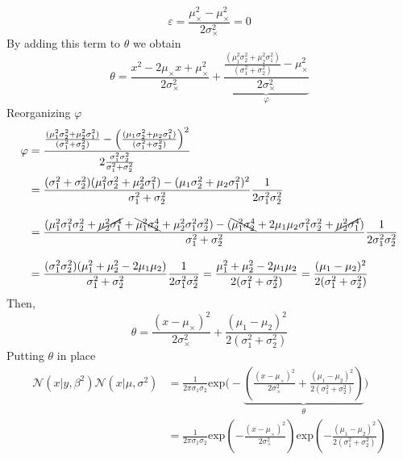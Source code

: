 \documentclass[article]{jss}
\newcommand{\N}{\mathcal{N}}
\begin{document}
%
\begin{equation}
 \varepsilon = \frac{\mu_{\times}^2-\mu_{\times}^2}{2\sigma_{\times}^2} = 0
\end{equation}
%
By adding this term to $\theta$ we obtain
\begin{equation}
 \theta = \frac{x^2 - 2\mu_{\times}x + \mu_{\times}^2 }{2\sigma_{\times}^2} + \underbrace{\frac{ \frac{(\mu_1^2\sigma_2^2 + \mu_2^2\sigma_1^2)}{(\sigma_1^2 + \sigma_2^2) } - \mu_{\times}^2}{2\sigma_{\times}^2}}_{\varphi}
\end{equation}
%
Reorganizing $\varphi$
\begin{equation}
\begin{split}
\varphi & = \frac{\frac{(\mu_1^2\sigma_2^2 + \mu_2^2\sigma_1^2)}{(\sigma_1^2 + \sigma_2^2) } - \left(\frac{(\mu_1\sigma_2^2 + \mu_2\sigma_1^2)}{(\sigma_1^2 + \sigma_2^2) }\right)^2 }{2\frac{\sigma_1^2\sigma_2^2}{\sigma_1^2+\sigma_2^2}}  \\
& = \frac{(\sigma_1^2 + \sigma_2^2)(\mu_1^2\sigma_2^2 + \mu_2^2\sigma_1^2) - (\mu_1\sigma_2^2 + \mu_2\sigma_1^2)^2}{\sigma_1^2 + \sigma_2^2}\frac{1}{2\sigma_1^2\sigma_2^2} \\[0.3cm]
& = \frac{(\mu_1^2\sigma_1^2\sigma_2^2 + \cancel{\mu_2^2\sigma_1^4} + \bcancel{\mu_1^2\sigma_2^4} + \mu_2^2\sigma_1^2\sigma_2^2) - (\bcancel{\mu_1^2\sigma_2^4} + 2\mu_1\mu_2\sigma_1^2\sigma_2^2 + \cancel{\mu_2^2\sigma_1^4} )}{\sigma_1^2 + \sigma_2^2}  \frac{1}{2\sigma_1^2\sigma_2^2} \\[0.3cm]
& = \frac{(\sigma_1^2\sigma_2^2)(\mu_1^2 + \mu_2^2 - 2\mu_1\mu_2)}{\sigma_1^2 + \sigma_2^2}\frac{1}{2\sigma_1^2\sigma_2^2} = \frac{\mu_1^2 + \mu_2^2 - 2\mu_1\mu_2}{2(\sigma_1^2 + \sigma_2^2)} = \frac{(\mu_1 - \mu_2)^2}{2(\sigma_1^2 + \sigma_2^2)}
\end{split}
\end{equation}
%
Then,
\begin{equation}
 \theta = \frac{(x-\mu_{\times})^2}{2\sigma_{\times}^2} + \frac{(\mu_1 - \mu_2)^2}{2(\sigma_1^2 + \sigma_2^2)}
\end{equation}
%
Putting $\theta$ in place
\begin{equation}
\begin{split}
 \N(x|y,\beta^2)\N(x|\mu,\sigma^2) & = \frac{1}{2\pi\sigma_1\sigma_2}\text{exp}\Bigg(-\underbrace{\left( \frac{(x-\mu_{\times})^2}{2\sigma_{\times}^2} + \frac{(\mu_1 - \mu_2)^2}{2(\sigma_1^2 + \sigma_2^2)} \right)}_{\theta} \Bigg) \\
 & = \frac{1}{2\pi\sigma_1\sigma_2}\text{exp}\left(  - \frac{(x-\mu_{\times})^2}{2\sigma_{\times}^2} \right) \text{exp} \left( - \frac{(\mu_1 - \mu_2)^2}{2(\sigma_1^2 + \sigma_2^2)} \right)
\end{split}
\end{equation}
\end{document}
